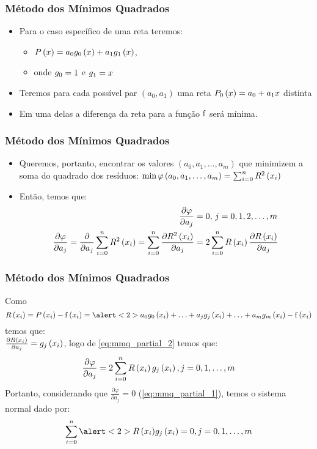 \begin{frame}
\frametitle{Método dos Mínimos Quadrados}

\begin{itemize}
  \item Para o caso específico de uma reta teremos:
    \begin{itemize}
      \item $P\left(x\right) = a_0 g_0 \left(x\right) + a_1 g_1 \left(x\right)$,
      \item onde $g_0 = 1$ e $g_1 = x$
    \end{itemize}
  \item Teremos para cada possível par $\left(a_0, a_1\right)$ uma reta $P_0 \left(x\right) = a_0 + a_1 x$ distinta
  \item Em uma delas a diferença da reta para a função $\mathrm{f}$ será mínima.
\end{itemize}
\end{frame}

\begin{frame}
\frametitle{Método dos Mínimos Quadrados}

\begin{itemize}
  \item Queremos, portanto, encontrar os valores $\left(a_0, a_1, \ldots, a_m\right)$ que minimizem a soma do quadrado dos resíduos: $\min \varphi\left(a_0,a_1,\ldots,a_m\right) = \sum_{i=0}^{n}R^2\left(x_i\right)$
  \item Então, temos que:
\begin{align}
\frac{\partial \varphi}{\partial a_j} &= 0,\, j = 0,1,2,\ldots,m\label{eq:mmq_partial_1}\\
%
\frac{\partial \varphi}{\partial a_j} = %
\frac{\partial}{\partial a_j} \sum_{i=0}^{n} R^2 \left(\x_i\right) = %
\sum_{i=0}^{n} \frac{\partial R^2 \left(\x_i\right)}{\partial a_j} &= %
2 \sum_{i=0}^{n} R\left(\x_i\right) \frac{\partial R \left(\x_i\right)}{\partial a_j}\label{eq:mmq_partial_2}
\end{align}
%
\end{itemize}
\end{frame}

\begin{frame}
\frametitle{Método dos Mínimos Quadrados}

Como
{
\footnotesize
\begin{equation}
\label{eq:mmq_partial_3}
R\left(x_i\right) = P\left(x_i\right) - \f\left(x_i\right) =%
\alert<2>{a_0 \G_0 \left(\x_i\right) + \ldots + a_j \G_j \left(x_i\right) + \ldots + a_m \G_m \left(x_i\right) - \f \left(\x_i\right)}
\end{equation}}%
temos que:\\
$\frac{\partial R \left(x_i\right)}{\partial a_j} = g_j \left(x_i\right)$, logo de \cref{eq:mmq_partial_2} temos que:
\[
\frac{\partial \varphi}{\partial a_j} = 2 \sum_{i=0}^{n} R\left(x_i\right) g_j \left(x_i\right), j = 0,1,\ldots,m
\]
Portanto, considerando que $\frac{\partial \varphi}{\partial a_j} = 0$ (\cref{eq:mmq_partial_1}), temos o sistema normal dado por:
\[
\sum_{i=0}^{n} \alert<2>{R\left(\x_i\right)} \G_j \left(\x_i\right) = 0, j = 0, 1, \ldots, m
\]
\end{frame}

